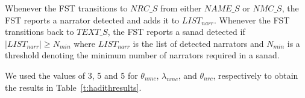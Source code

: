 \documentclass{llncs}
\begin{document}
Whenever the FST transitions to $\mathit{NRC\_S}$ from either
$\mathit{NAME\_S}$ or $\mathit{NMC\_S}$, the FST reports 
a narrator detected and adds it to $\mathit{LIST}_{\mathit{narr}}$.
Whenever the FST transitions back to $\mathit{TEXT\_S}$,
the FST reports a sanad detected if 
$|\mathit{LIST}_{\mathit{narr}}| \ge N_{min}$ where 
$\mathit{LIST}_{\mathit{narr}}$ is the list 
of detected narrators and $N_{min}$ is a threshold denoting 
the minimum number of narrators required in a sanad.

We used the values of 3, 5 and 5 for $\theta_{\mathit{nmc}}$, 
$\lambda_{\mathit{nmc}}$, and 
$\theta_{\mathit{nrc}}$, respectively to obtain the results in 
Table~\ref{t:hadithresults}.

\begin{figure}[tb!]
\end{figure}




\end{document}
